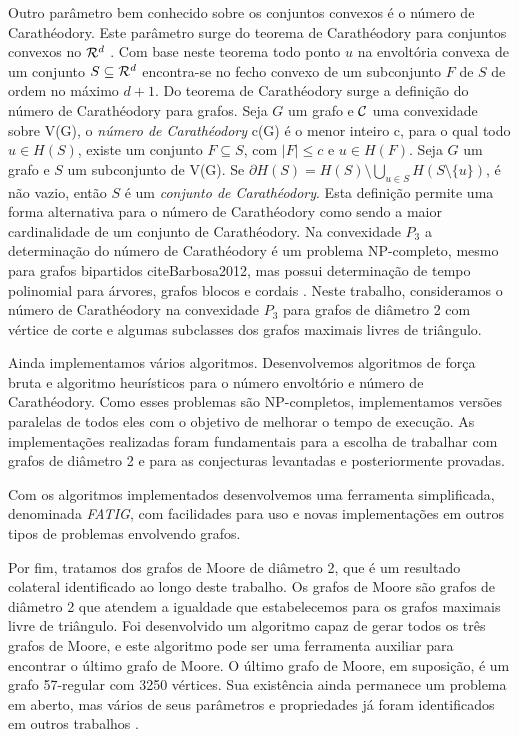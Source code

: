 Outro parâmetro bem conhecido sobre os conjuntos convexos é o número de Carathéodory. Este parâmetro surge do teorema de Carathéodory para conjuntos convexos no ${\cal R}^d$ \cite{Caratheodory1911}.
Com base neste teorema todo ponto $u$ na envoltória convexa de um conjunto $S \subseteq {\cal R}^d$ encontra-se no fecho
convexo de um subconjunto $F$ de $S$ de ordem no máximo $d+1$. Do teorema de Carathéodory surge  a definição do número de 
Carathéodory para grafos. Seja $G$ um grafo e ${\cal C}$ uma convexidade sobre V(G), o \textit{número de Carathéodory} c(G) é o menor inteiro c, para o qual todo $u \in H(S)$, existe um conjunto $F \subseteq  S$, com $|F| \le c$ e $u \in H(F)$.  Seja $G$ um grafo e $S$ um subconjunto de V(G). Se $\partial H(S)=H(S) \setminus \bigcup _{u \in S} H(S \setminus \{u\})$, é não vazio, então $S$ é um \textit{conjunto de Carathéodory}. Esta definição permite uma forma alternativa para o número de Carathéodory como sendo a maior cardinalidade de um conjunto de Carathéodory. Na convexidade $P_3$ a determinação do número de Carathéodory é um problema NP-completo, mesmo para grafos bipartidos cite{Barbosa2012}, mas possui determinação de tempo polinomial para árvores, grafos blocos \cite{Barbosa2012} e cordais \cite{Coelho2014}. Neste trabalho, consideramos o número de Carathéodory na convexidade $P_3$ para grafos de diâmetro 2 com vértice de corte e algumas subclasses dos grafos maximais livres de triângulo.

Ainda implementamos vários algoritmos. Desenvolvemos algoritmos de força bruta e algoritmo heurísticos para o número envoltório e número de Carathéodory. Como esses problemas são NP-completos, implementamos versões paralelas de todos eles com o objetivo de melhorar o tempo de execução. As implementações realizadas foram fundamentais para a escolha de trabalhar com grafos de diâmetro 2 e para as conjecturas levantadas e posteriormente provadas.

Com os algoritmos implementados desenvolvemos uma ferramenta simplificada, denominada {\it FATIG}, com facilidades para uso e novas implementações em outros tipos de problemas envolvendo grafos.

Por fim, tratamos dos grafos de Moore de diâmetro 2, 
que é um resultado colateral identificado ao longo deste trabalho. Os grafos de Moore são grafos de diâmetro 2 que atendem a igualdade que estabelecemos para os grafos maximais livre de triângulo. Foi desenvolvido um algoritmo capaz de gerar todos os três grafos de Moore, e este algoritmo pode ser uma ferramenta auxiliar para encontrar o último grafo de Moore. O último grafo de Moore, em suposição, é um grafo 57-regular com 3250 vértices. Sua existência ainda permanece um problema em aberto, mas vários de seus parâmetros e propriedades já foram identificados em outros trabalhos \cite{Godsil1995,Macaj2010,Miller2005}.

